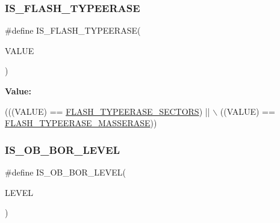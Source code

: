 \subsubsection{\texorpdfstring{I\+S\+\_\+\+F\+L\+A\+S\+H\+\_\+\+T\+Y\+P\+E\+E\+R\+A\+SE}{IS\_FLASH\_TYPEERASE}}
{\footnotesize\ttfamily \#define I\+S\+\_\+\+F\+L\+A\+S\+H\+\_\+\+T\+Y\+P\+E\+E\+R\+A\+SE(\begin{DoxyParamCaption}\item[{}]{V\+A\+L\+UE }\end{DoxyParamCaption})}

{\bfseries Value\+:}
\begin{DoxyCode}
(((VALUE) == \mbox{\hyperlink{group___f_l_a_s_h_ex___type___erase_gaee700cbbc746cf72fca3ebf07ee20c4e}{FLASH\_TYPEERASE\_SECTORS}}) || \(\backslash\)
                                  ((VALUE) == \mbox{\hyperlink{group___f_l_a_s_h_ex___type___erase_ga9bc03534e69c625e1b4f0f05c3852243}{FLASH\_TYPEERASE\_MASSERASE}}))
\end{DoxyCode}
\mbox{\label{group___f_l_a_s_h_ex___i_s___f_l_a_s_h___definitions_gac97ecd832fce5f4b4ff9ef7bc4493013}} 
\subsubsection{\texorpdfstring{I\+S\+\_\+\+O\+B\+\_\+\+B\+O\+R\+\_\+\+L\+E\+V\+EL}{IS\_OB\_BOR\_LEVEL}}
{\footnotesize\ttfamily \#define I\+S\+\_\+\+O\+B\+\_\+\+B\+O\+R\+\_\+\+L\+E\+V\+EL(\begin{DoxyParamCaption}\item[{}]{L\+E\+V\+EL }\end{DoxyParamCaption})}

